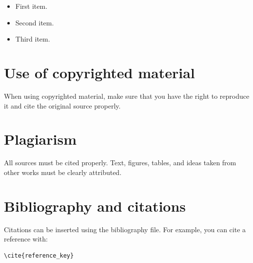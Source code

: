 \begin{itemize}
    \item First item.
    \item Second item.
    \item Third item.
\end{itemize}

\section{Use of copyrighted material}
\label{sec:copyrighted_material}

When using copyrighted material, make sure that you have the right to reproduce it and cite the original source properly.

\section{Plagiarism}
\label{sec:plagiarism}

All sources must be cited properly. Text, figures, tables, and ideas taken from other works must be clearly attributed.

\section{Bibliography and citations}
\label{sec:bibliography_citations}

Citations can be inserted using the bibliography file. For example, you can cite a reference with:

\begin{verbatim}
\cite{reference_key}
\end{verbatim}